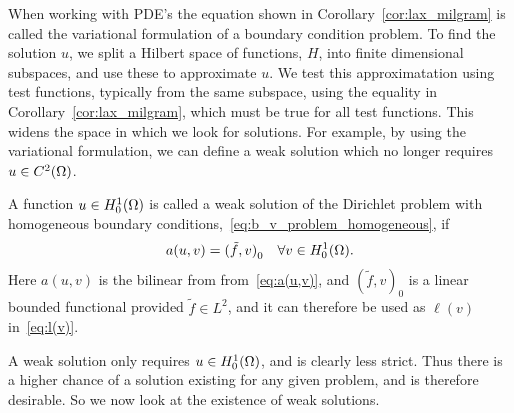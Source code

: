 When working with PDE's the equation shown in Corollary~\ref{cor:lax_milgram} 
is called the variational formulation of a boundary condition problem. 
To find the solution $u$, we split a Hilbert space of functions, $H$, 
into finite dimensional subspaces, and use these to approximate $u$. 
We test this approximatation using test functions, typically from the same subspace,
 using the equality in Corollary~\ref{cor:lax_milgram}, which must be true for all test functions.
This widens the 
space in which we look for solutions.
For example, by using the variational formulation, we can define a weak solution 
which no longer requires $u \in C^2(\Omega)$.
\begin{defn}{\quad}
    A function $u\in H_0^1(\Omega)$ is called a weak solution of 
    the Dirichlet problem with homogeneous boundary conditions,~\eqref{eq:b_v_problem_homogeneous}, if 
     \begin{equation*}
        a(u,v) = {(\tilde{f},v)}_0 \quad \forall v \in H_0^1(\Omega).
     \end{equation*}
     Here $a(u,v)$ is the bilinear from from~\eqref{eq:a(u,v)}, 
     and ${(\tilde{f},v)}_0$ is a linear bounded functional provided $\tilde{f}\in L^2$, and it can therefore be used as $\ell(v)$ in~\eqref{eq:l(v)}.
\end{defn}
A weak solution only requires $u\in H_0^1(\Omega)$, and is clearly less strict. 
Thus there is a higher chance of a solution existing for any given problem, 
and is therefore desirable. So we now look at the existence of weak solutions.



